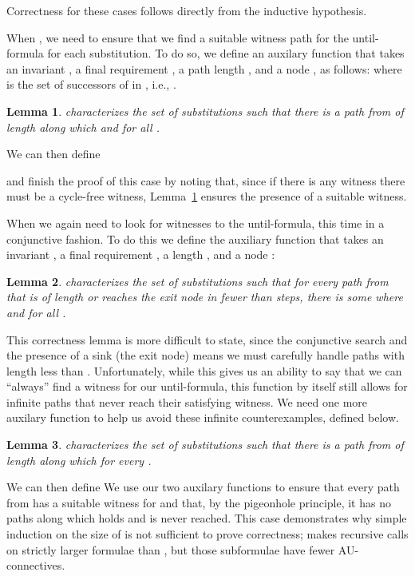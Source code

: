 \documentclass{eptcs}
\newtheorem{lemma}{Lemma}
\begin{document}
Correctness for these cases follows directly from the inductive hypothesis.

When , we need to ensure that we find a suitable witness path for the until-formula
for each substitution. To do so, we define an auxilary function 
that takes an invariant , a final requirement
, a path length , and a node , as follows:
 where  is the set of successors of  in , i.e., .
\begin{lemma}\label{lem:pathsback}
 characterizes the set of substitutions  such that 
there is a path  from  of length  along which  and  for all
.
\end{lemma}
We can then define 

and finish the proof of this case by noting that, since if there is any witness 
there must be a cycle-free witness, Lemma~\ref{lem:pathsback} ensures the presence of a suitable witness.

When  we again need to look for witnesses to the until-formula, this time in a
conjunctive fashion. To do this we define the auxiliary function  that takes an invariant
, a final requirement , a length
, and a node :

\begin{lemma}\label{lem:pathsand}
 characterizes the set of substitutions  such that
for every path  from  that is of length  or reaches the exit node in fewer than  steps,
there is some  where  and  for all .
\end{lemma}
This correctness lemma is more difficult to state, since the conjunctive search and the
presence of a sink (the exit node) means we must carefully handle paths with length less than
. Unfortunately, while this gives us an ability to say that we can ``always''
find a witness for our until-formula, this function by itself still allows for infinite paths that
never reach their satisfying witness. We need one more auxilary function to
help us avoid these infinite counterexamples, defined below.


\begin{lemma}\label{lem:pathsforward}
 characterizes the set of substitutions  such that there is a path  from  of length  along which  for every .
\end{lemma}
We can then define 
We use our two auxilary functions to ensure that every path from  has a suitable
witness for  and that, by the pigeonhole principle, it has no paths along which  holds and  is never reached. This case demonstrates why simple induction on the size of  is not sufficient to prove correctness;  makes recursive calls on strictly larger formulae than , but those subformulae have fewer AU-connectives.
\end{document}
